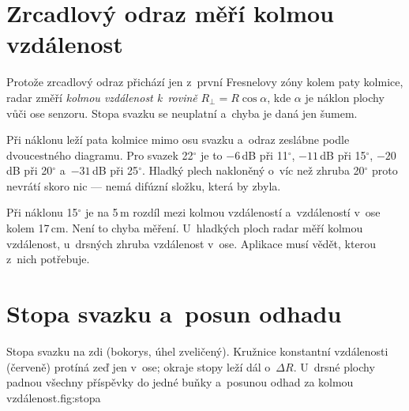 \documentclass[czech]{skyren}
\begin{document}
\section{Zrcadlový odraz měří kolmou vzdálenost}

Protože zrcadlový odraz přichází jen z~první Fresnelovy zóny kolem paty
kolmice, radar změří \emph{kolmou vzdálenost k~rovině} $R_\perp = R\cos\alpha$,
kde $\alpha$ je náklon plochy vůči ose senzoru. Stopa svazku se neuplatní
a~chyba je daná jen šumem.

Při náklonu leží pata kolmice mimo osu svazku a~odraz zeslábne podle
dvoucestného diagramu. Pro svazek 22$^\circ$ je to $-6$\,dB při
11$^\circ$, $-11$\,dB při 15$^\circ$, $-20$\,dB při 20$^\circ$ a~$-31$\,dB
při 25$^\circ$. Hladký plech nakloněný o~víc než zhruba 20$^\circ$ proto
nevrátí skoro nic --- nemá difúzní složku, která by zbyla.

\begin{skyrennote}
Při náklonu 15$^\circ$ je na 5\,m rozdíl mezi kolmou vzdáleností a~vzdáleností
v~ose kolem 17\,cm. Není to chyba měření. U~hladkých ploch radar měří
kolmou vzdálenost, u~drsných zhruba vzdálenost v~ose. Aplikace musí vědět,
kterou z~nich potřebuje.
\end{skyrennote}

\section{Stopa svazku a~posun odhadu}

\begin{skyrenfigure}{Stopa svazku na zdi (bokorys, úhel zveličený). Kružnice
konstantní vzdálenosti (červeně) protíná zeď jen v~ose; okraje stopy leží
dál o~$\Delta R$. U~drsné plochy padnou všechny příspěvky do jedné buňky
a~posunou odhad za kolmou vzdálenost.}{fig:stopa}
\end{skyrenfigure}
\end{document}

